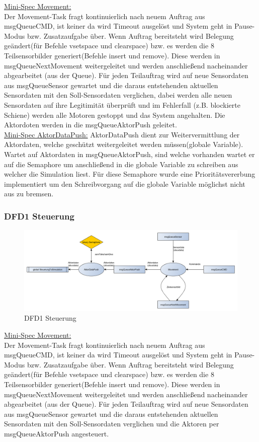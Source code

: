 \underline{Mini-Spec Movement:}\\
Der Movement-Task fragt kontinuierlich nach neuem Auftrag aus msgQueueCMD, ist keiner da wird Timeout ausgelöst und System geht in Pause-Modus bzw. Zusatzaufgabe über. Wenn Auftrag bereitsteht wird Belegung geändert(für Befehle vsetspace und clearspace) bzw. es werden die 8 Teilsensorbilder generiert(Befehle insert und remove). Diese werden in msgQueueNextMovement weitergeleitet und werden anschließend nacheinander abgearbeitet (aus der Queue). Für jeden Teilauftrag wird auf neue Sensordaten aus msgQueueSensor gewartet und die daraus entstehenden aktuellen Sensordaten mit den Soll-Sensordaten verglichen, dabei werden alle neuen Sensordaten auf ihre Legitimität überprüft und im Fehlerfall (z.B. blockierte Schiene) werden alle Motoren gestoppt und das System angehalten. Die Aktordoten werden in die msgQueueAktorPush geleitet. \\

\underline{Mini-Spec AktorDataPush:}
AktorDataPush dient zur Weitervermittlung der Aktordaten, welche geschützt weitergeleitet werden müssen(globale Variable).
Wartet auf Aktordaten in msgQueueAktorPush, sind welche vorhanden wartet er auf die Semaphore um anschließend in die globale Variable zu schreiben aus welcher die Simulation liest. Für diese Semaphore wurde eine Prioritätsvererbung implementiert um den Schreibvorgang auf die globale Variable möglichst nicht aus zu bremsen. \\

\subsubsection{DFD1 Steuerung}
\begin{figure}[H]
	\centering
  \includegraphics[width=\textwidth]{DFD/dfd1_steuerung.png}
	\caption{DFD1 Steuerung}
	\label{fig3}
\end{figure}

\underline{Mini-Spec Movement:}\\
Der Movement-Task fragt kontinuierlich nach neuem Auftrag aus msgQueueCMD, ist keiner da wird Timeout ausgelöst und System geht in Pause-Modus bzw. Zusatzaufgabe über. Wenn Auftrag bereitsteht wird Belegung geändert(für Befehle vsetspace und clearspace) bzw. es werden die 8 Teilsensorbilder generiert(Befehle insert und remove). Diese werden in msgQueueNextMovement weitergeleitet und werden anschließend nacheinander abgearbeitet (aus der Queue). Für jeden Teilauftrag wird auf neue Sensordaten aus msgQueueSensor gewartet und die daraus entstehenden aktuellen Sensordaten mit den Soll-Sensordaten verglichen und die Aktoren per msgQueueAktorPush angesteuert. \\


